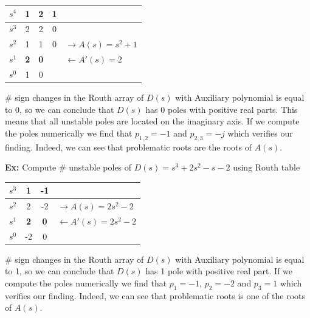 \documentclass[twoside]{article}
\begin{document}
\vspace{6pt}
\begin{minipage}[h]{1\linewidth}
\begin{center}
\begin{tabular}{|c || c || c c | l |}
\hline
$s^4$ & 1 & 2 & 1 &
\\ \hline
$s^3$ & 2 & 2 & 0 &
\\ \hline
$s^2$ & 1 & 1 & 0 & $\rightarrow A(s) = s^2 + 1$
\\ \hline
$s^1$ & \textbf{2} & \textbf{0} &   & $\leftarrow A'(s) = 2$
\\ \hline
$s^0$ & 1 & 0 & &
\\ \hline
\end{tabular}
\end{center}
\end{minipage}
\vspace{6pt}

$\#$ sign changes in the Routh array of $D(s)$ with Auxiliary polynomial
is equal to 0, so we can conclude that $D(s)$ has 0 poles with
positive real parts. This means that all unstable poles are located on
the imaginary axis. If we compute the poles numerically we find that
$p_{1,2} = -1$ and $p_{2,3} = - j$ which verifies our finding. Indeed,
we can see that problematic roots are the roots of $A(s)$.

\vspace{6pt}

\textbf{Ex:} Compute $\#$ unstable poles of $D(s) = s^3 + 2 s^2 - s - 2 $ using Routh table
%
\begin{table}[h]
\begin{center}
\begin{tabular}{|c || c || c | l |}
\hline
$s^3$ & 1 & -1 & 
\\ \hline
$s^2$ & 2 & -2 & $\rightarrow A(s) = 2 s^2 - 2$
\\ \hline
$s^1$ & \textbf{2} & \textbf{0} & $\leftarrow A'(s) = 2 s^2 - 2$
\\ \hline
$s^0$ & -2 & 0 & 
\\ \hline
\end{tabular}
\end{center}
\end{table}

$\#$ sign changes in the Routh array of $D(s)$ with Auxiliary polynomial
is equal to 1, so we can conclude that $D(s)$ has 1 pole with
positive real part. If we compute the poles numerically we find that
$p_{1} = -1$, $p_2 = -2$ and $p_{3} = 1$ which verifies our finding. Indeed,
we can see that problematic roots is one of the roots of $A(s)$.
\end{document}
